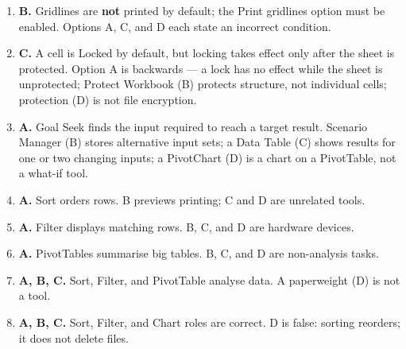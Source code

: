 \documentclass[11pt]{article}
\begin{document}
\begin{enumerate}[label=\textbf{Q\arabic*.}, leftmargin=*]
\item \textbf{B.} Gridlines are \textbf{not} printed by default; the Print
  gridlines option must be enabled. Options A, C, and D each state an incorrect
  condition.
\item \textbf{C.} A cell is Locked by default, but locking takes effect only
  after the sheet is protected. Option A is backwards --- a lock has no effect
  while the sheet is unprotected; Protect Workbook (B) protects structure, not
  individual cells; protection (D) is not file encryption.
\item \textbf{A.} Goal Seek finds the input required to reach a target result.
  Scenario Manager (B) stores alternative input sets; a Data Table (C) shows
  results for one or two changing inputs; a PivotChart (D) is a chart on a
  PivotTable, not a what-if tool.

\item \textbf{A.} Sort orders rows. B previews printing; C and D are unrelated tools.
\item \textbf{A.} Filter displays matching rows. B, C, and D are hardware devices.
\item \textbf{A.} PivotTables summarise big tables. B, C, and D are non-analysis tasks.
\item \textbf{A, B, C.} Sort, Filter, and PivotTable analyse data. A paperweight (D) is not a tool.
\item \textbf{A, B, C.} Sort, Filter, and Chart roles are correct. D is false: sorting reorders; it does not delete files.
\end{enumerate}
\def\JKSSBLessonID{27}\def\JKSSBAnswers{1}
\end{document}
